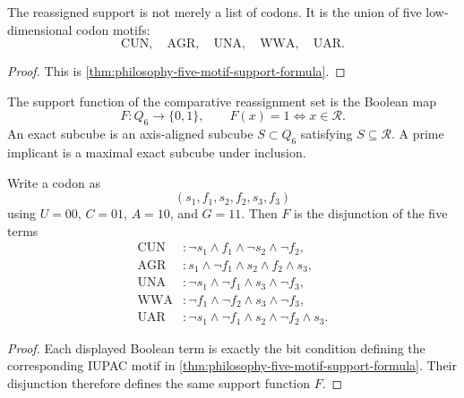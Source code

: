 \begin{corollary}
\label{cor:philosophy-support-union-of-motifs}
The reassigned support is not merely a list of codons. It is the union
of five low-dimensional codon motifs:
$$
  \mathrm{CUN},\quad \mathrm{AGR},\quad \mathrm{UNA},
  \quad \mathrm{WWA},\quad \mathrm{UAR}.
$$
\end{corollary}
\begin{proof}
This is \autoref{thm:philosophy-five-motif-support-formula}.
\end{proof}

\begin{definition}
\label{def:philosophy-reassignment-support-function}
The support function of the comparative reassignment set is the Boolean
map
$$
  F:Q_{6}\to\{0,1\},
  \qquad
  F(x)=1\Longleftrightarrow x\in\mathcal{R}.
$$
An exact subcube is an axis-aligned subcube $S\subset Q_{6}$ satisfying
$S\subseteq\mathcal{R}$. A prime implicant is a maximal exact subcube
under inclusion.
\end{definition}

\begin{theorem}
\label{thm:philosophy-reassignment-boolean-dnf}
Write a codon as
$$
  (s_{1},f_{1},s_{2},f_{2},s_{3},f_{3})
$$
using $U=00$, $C=01$, $A=10$, and $G=11$. Then $F$ is the disjunction
of the five terms
$$
\begin{aligned}
  \mathrm{CUN}&:\neg s_{1}\wedge f_{1}\wedge\neg s_{2}\wedge\neg f_{2},\\
  \mathrm{AGR}&:s_{1}\wedge\neg f_{1}\wedge s_{2}\wedge f_{2}\wedge s_{3},\\
  \mathrm{UNA}&:\neg s_{1}\wedge\neg f_{1}\wedge s_{3}\wedge\neg f_{3},\\
  \mathrm{WWA}&:\neg f_{1}\wedge\neg f_{2}\wedge s_{3}\wedge\neg f_{3},\\
  \mathrm{UAR}&:\neg s_{1}\wedge\neg f_{1}\wedge s_{2}\wedge\neg f_{2}\wedge s_{3}.
\end{aligned}
$$
\end{theorem}
\begin{proof}
Each displayed Boolean term is exactly the bit condition defining the
corresponding IUPAC motif in
\autoref{thm:philosophy-five-motif-support-formula}. Their disjunction
therefore defines the same support function $F$.
\end{proof}

